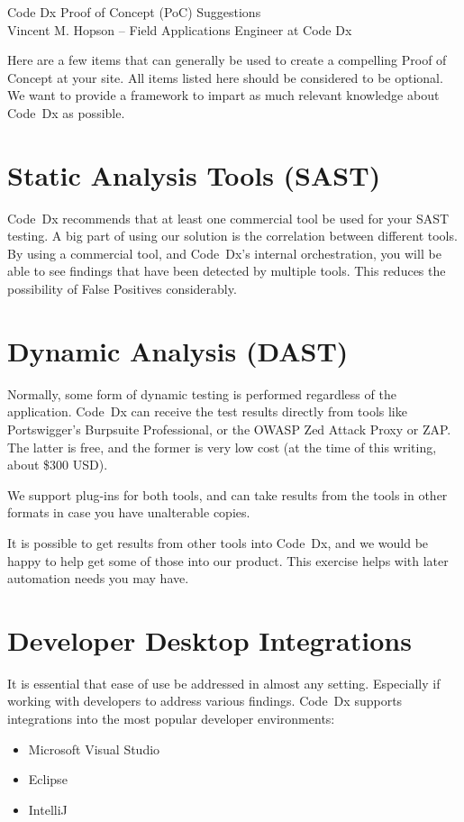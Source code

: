 \documentclass[11pt]{article}
\newcommand\codedx{{\color{blue}Code~Dx}\xspace}
\newcommand\MS{Microsoft\texttrademark\xspace}
\begin{document}
\begin{center}
  {\titlefont Code Dx Proof of Concept (PoC) Suggestions}\\
  {\subtitlefont Vincent M. Hopson  -- Field Applications Engineer at Code Dx}\\[5mm]
\end{center}

Here are a few items that can generally be used to create a compelling Proof of Concept at your site.  All items
listed here should be considered to be optional.  We want to provide a framework to impart as much relevant 
knowledge about \codedx as possible.

\section{Static Analysis Tools (SAST)}

\codedx recommends that at least one commercial tool be used for your SAST testing.  A big part of using
our solution is the correlation between different tools.  By using a commercial tool, and \codedx's internal
orchestration, you will be able to see findings that have been detected by multiple tools.  This reduces the
possibility of {\color{red}False Positives} considerably.

\section{Dynamic Analysis (DAST)}

Normally, some form of dynamic testing is performed regardless of the application.  \codedx can receive the
test results directly from tools like Portswigger's Burpsuite Professional, or the OWASP Zed Attack Proxy
or ZAP.  The latter is free, and the former is very low cost (at the time of this writing, about \$300 USD).

We support plug-ins for both tools, and can take results from the tools in other formats in case you have
unalterable copies.

It is possible to get results from other tools into \codedx, and we would be happy to help get some of those
into our product.  This exercise helps with later automation needs you may have.

\section{Developer Desktop Integrations}

It is essential that ease of use be addressed in almost any setting.  Especially if working with developers to 
address various findings.  \codedx supports integrations into the most popular developer environments:
\begin{itemize}
	\item \MS Visual Studio
	\item Eclipse
	\item IntelliJ
\end{itemize}
\end{document}
